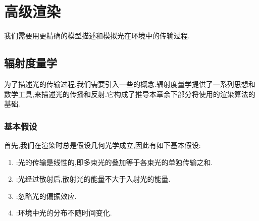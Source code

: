 \documentclass{ctexart}
\begin{document}
\section{高级渲染}
我们需要用更精确的模型描述和模拟光在环境中的传输过程.
\subsection{辐射度量学}
为了描述光的传输过程,我们需要引入一些的概念.辐射度量学提供了一系列思想和数学工具,来描述光的传播和反射.它构成了推导本章余下部分将使用的渲染算法的基础.
\subsubsection{基本假设}
首先,我们在渲染时总是假设几何光学成立,因此有如下基本假设:
\begin{theorem}[光的基本假设]
    \begin{enumerate}[label=\tbf{\arabic*.}]
        \item {}:光的传输是线性的,即多束光的叠加等于各束光的单独传输之和.
        \item {}:光经过散射后,散射光的能量不大于入射光的能量.
        \item {}:忽略光的偏振效应.
        \item {}:环境中光的分布不随时间变化.
    \end{enumerate}
\end{theorem}
\end{document}
